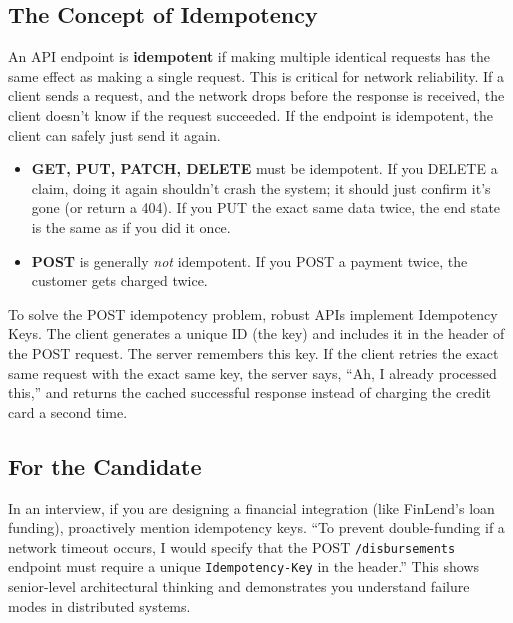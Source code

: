 \documentclass[
  11pt,
  openany,
  oneside]{book}
\providecommand{\tightlist}{%
  \setlength{\itemsep}{0pt}\setlength{\parskip}{0pt}}
\renewenvironment{quote}{\begin{customquote}}{\end{customquote}}
\begin{document}
\subsection{The Concept of
Idempotency}\label{the-concept-of-idempotency}

An API endpoint is \textbf{idempotent} if making multiple identical
requests has the same effect as making a single request. This is
critical for network reliability. If a client sends a request, and the
network drops before the response is received, the client doesn't know
if the request succeeded. If the endpoint is idempotent, the client can
safely just send it again.

\begin{itemize}
\tightlist
\item
  \textbf{GET, PUT, PATCH, DELETE} must be idempotent. If you DELETE a
  claim, doing it again shouldn't crash the system; it should just
  confirm it's gone (or return a 404). If you PUT the exact same data
  twice, the end state is the same as if you did it once.
\item
  \textbf{POST} is generally \emph{not} idempotent. If you POST a
  payment twice, the customer gets charged twice.
\end{itemize}

To solve the POST idempotency problem, robust APIs implement Idempotency
Keys. The client generates a unique ID (the key) and includes it in the
header of the POST request. The server remembers this key. If the client
retries the exact same request with the exact same key, the server says,
``Ah, I already processed this,'' and returns the cached successful
response instead of charging the credit card a second time.

\begin{quote}
\subsection{For the Candidate}\label{for-the-candidate}

In an interview, if you are designing a financial integration (like
FinLend's loan funding), proactively mention idempotency keys. ``To
prevent double-funding if a network timeout occurs, I would specify that
the POST \texttt{/disbursements} endpoint must require a unique
\texttt{Idempotency-Key} in the header.'' This shows senior-level
architectural thinking and demonstrates you understand failure modes in
distributed systems.
\end{quote}
\end{document}
